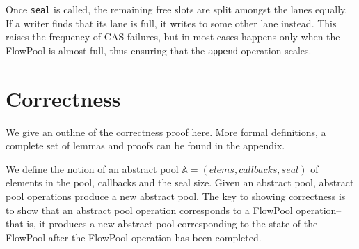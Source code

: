 \documentclass[runningheads,a4paper]{llncs}
\begin{document}
Once \verb=seal= is called, the remaining free slots
are split amongst the lanes equally.
If a writer finds that its lane is full,
it writes to some other lane instead.
This raises the frequency of CAS failures, but in most
cases happens only when the FlowPool is almost full,
thus ensuring that the \verb=append= operation scales.


\section{Correctness}
\label{sec:correctness}
We give an outline of the correctness proof here. More formal
definitions, a complete set of lemmas and proofs can be found in the
appendix.

We define the notion of an abstract pool $\mathbb{A} = (elems,
callbacks, seal)$ of elements in the pool, callbacks and the seal
size.
Given an abstract pool, abstract pool operations produce a new
abstract pool.
The key to showing correctness is to show that an abstract pool operation
corresponds to a FlowPool operation-- that is, it produces a
new abstract pool corresponding to the state of the FlowPool after
the FlowPool operation has been completed.



%
\end{document}
